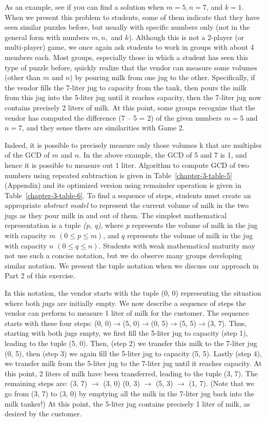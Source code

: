 \begin{multicols}{2}
As an example, see if you can find a solution when $m = 5, n = 7$, and $k = 1$. When we present this problem to students, some of them indicate that they have seen similar puzzles before, but usually with specific numbers only (not in the general form with numbers $m, n,$ and $k$). Although this is not a 2-player (or multi-player) game, we once again ask students to work in groups with about 4 members each. Most groups, especially those in which a student has seen this type of puzzle before, quickly realize that the vendor can measure some volumes (other than $m$ and $n$) by pouring milk from one jug to the other. Specifically, if the vendor fills the 7-liter jug to capacity from the tank, then pours the milk from this jug into the 5-liter jug until it reaches capacity, then the 7-liter jug now contains precisely 2 liters of milk. At this point, some groups recognize that the vendor has computed the difference (7 – 5 = 2) of the given numbers $m = 5$ and $n = 7$, and they sense there are similarities with Game 2.

Indeed, it is possible to precisely measure only those volumes k that are multiples of the GCD of $m$ and $n$. In the above example, the GCD of 5 and 7 is 1, and hence it is possible to measure out 1 liter. Algorithm to compute GCD of two numbers using repeated subtraction is given in Table~\ref{chapter-3-table-5} (Appendix) and its optimized version using remainder operation is given in Table~\ref{chapter-3-table-6}. To find a sequence of steps, students must create an appropriate \textit{abstract model} to represent the current volume of milk in the two jugs as they pour milk in and out of them. The simplest mathematical representation is a tuple \textit{(p, q)}, where \textit{p} represents the volume of milk in the jug with capacity $m$ $(0 \leq p \leq m)$, and $q$ represents the volume of milk in the jug with capacity $n$ $(0 \leq q \leq n)$. Students with weak mathematical maturity may not use such a concise notation, but we do observe many groups developing similar notation. We present the tuple notation when we discuss our approach in Part 2 of this exercise.

In this notation, the vendor starts with the tuple (0, 0) representing the situation where both jugs are initially empty. We now describe a sequence of steps the vendor can perform to measure 1 liter of milk for the customer. The sequence starts with these four steps: (0, 0)$\rightarrow$(5, 0)$\rightarrow$(0, 5)$\rightarrow$(5, 5)$\rightarrow$(3, 7). Thus, starting with both jugs empty, we first fill the 5-liter jug to capacity (step 1), leading to the tuple (5, 0). Then, (step 2) we transfer this milk to the 7-liter jug (0, 5), then (step 3) we again fill the 5-liter jug to capacity (5, 5). Lastly (step 4), we transfer milk from the 5-liter jug to the 7-liter jug until it reaches capacity. At this point, 2 liters of milk have been transferred, leading to the tuple (3, 7). The remaining steps are: (3, 7) $\rightarrow$ (3, 0)  (0, 3) $\rightarrow$ (5, 3) $\rightarrow$ (1, 7). (Note that we go from (3, 7) to (3, 0) by emptying all the milk in the 7-liter jug back into the milk tanker!) At this point, the 5-liter jug contains precisely 1 liter of milk, as desired by the customer.


\end{multicols}
